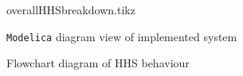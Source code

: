 \begin{figure}[htb]
    \centering
    {overallHHSbreakdown.tikz}
    \caption{\texttt{Modelica} diagram view of implemented system}
    \label{fig:modelicadiagram}
\end{figure}


\begin{figure}[htb]
    \centering
    
    
    \caption{Flowchart diagram of \acs{HHS} behaviour}
    \label{fig:hhsflowchart}
\end{figure}

